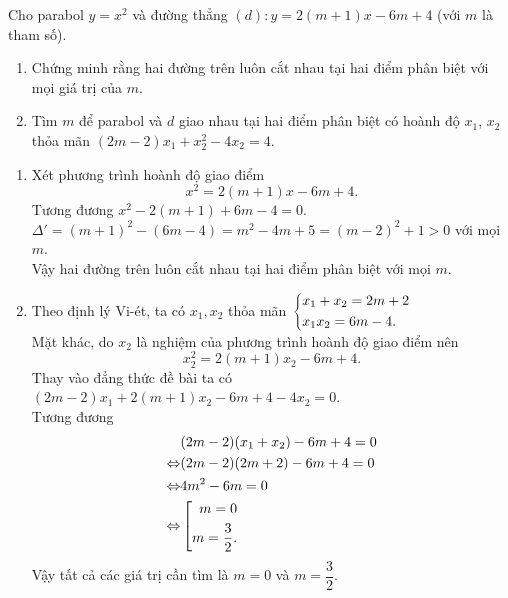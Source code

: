\begin{bt}%
	Cho parabol $y=x^2$ và đường thẳng $(d)\colon
	y=2(m+1)x-6m+4$ (với $m$ là tham số).
	\begin{enumerate}
		\item Chứng minh rằng hai đường trên luôn cắt nhau tại hai điểm phân biệt với mọi giá trị của $m$.
		\item Tìm $m$ để parabol và $d$ giao nhau tại hai điểm phân biệt có hoành độ $x_1$, $x_2$ thỏa mãn $(2m-2)x_1+x_2^2-4x_2=4$.
	\end{enumerate}
	\loigiai
	{
		\begin{enumerate}
			\item Xét phương trình hoành độ giao điểm
			$$x^2 = 2(m+1)x - 6m + 4. $$
			Tương đương $x^2 - 2(m+1) + 6m - 4 = 0$.\\
			$\Delta' = (m+1)^2 - (6m-4) = m^2 - 4m + 5  = (m-2)^2 + 1 > 0$ với mọi $m$.\\
			Vậy hai đường trên luôn cắt nhau tại hai điểm phân biệt với mọi $m$.
			\item  Theo định lý Vi-ét, ta có $x_1, x_2$ thỏa mãn $\left\{\begin{aligned}&x_1 + x_2 = 2m + 2\\ &x_1x_2 = 6m - 4.\end{aligned}\right.$\\
			Mặt khác, do $x_2$ là nghiệm của phương trình hoành độ giao điểm nên $$x_2^2 = 2(m+1)x_2 - 6m + 4.$$
			Thay vào đẳng thức đề bài ta có $(2m-2)x_1 + 2(m+1)x_2 - 6m + 4 - 4x_2 = 0$.\\
			Tương đương 
			\begin{eqnarray*}
				& (2m-2)(x_1 + x_2) - 6m + 4 = 0 \\
				\Leftrightarrow & (2m - 2)(2m+2) - 6m + 4 = 0\\
				\Leftrightarrow & 4m^2 - 6m = 0\\
				\Leftrightarrow & \left[\begin{aligned}m = 0\\ m = \dfrac{3}{2}.\end{aligned}\right.
			\end{eqnarray*}
			Vậy tất cả các giá trị cần tìm là $m=0$ và $m=\dfrac{3}{2}$.
		\end{enumerate}
		
	}
\end{bt}

